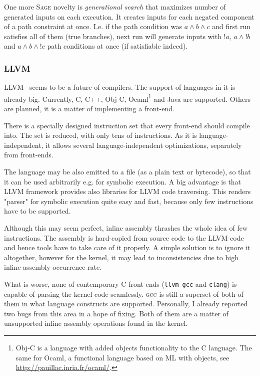 \documentclass[11pt,a4paper]{article}
\begin{document}
One more \textsc{Sage} novelty is \emph{generational search} that maximizes
number of generated inputs on each execution. It creates inputs for each
negated component of a path constraint at once. I.e. if the path condition was
$a \wedge b \wedge c$ and first run satisfies all of them (true branches),
next run will generate inputs with $!a$, $a \wedge !b$ and $a \wedge b \wedge
!c$ path conditions at once (if satisfiable indeed).

\subsubsection{LLVM}
\label{llvm}
LLVM~\cite{llvm} seems to be a future of compilers. The support of languages
in it is already big. Currently, C, C++, Obj-C, Ocaml\footnote{Obj-C is a
language with added objects functionality to the C language. The same for
Ocaml, a functional language based on ML with objects, see
\url{http://pauillac.inria.fr/ocaml/}.} and Java are supported.  Others are
planned, it is a matter of implementing a front-end.

There is a specially designed instruction set that every front-end should
compile into. The set is reduced, with only tens of instructions. As it is
language-independent, it allows several language-independent optimizations,
separately from front-ends.

The language may be also emitted to a file (as a plain text or bytecode), so
that it can be used arbitrarily e.g. for symbolic execution. A big advantage
is that LLVM framework provides also libraries for LLVM code traversing. This
renders "parser" for symbolic execution quite easy and fast, because only few
instructions have to be supported.

Although this may seem perfect, inline assembly thrashes the whole idea of few
instructions. The assembly is hard-copied from source code to the LLVM code
and hence tools have to take care of it properly. A simple solution is to
ignore it altogether, however for the kernel, it may lead to inconsistencies
due to high inline assembly occurrence rate.

What is worse, none of contemporary C front-ends (\texttt{llvm-gcc} and
\texttt{clang}) is capable of parsing the kernel code seamlessly. \textsc{gcc}
is still a superset of both of them in what language constructs are supported.
Personally, I already reported two bugs from this area in a hope of fixing.
Both of them are a matter of unsupported inline assembly operations found in
the kernel.
\end{document}
